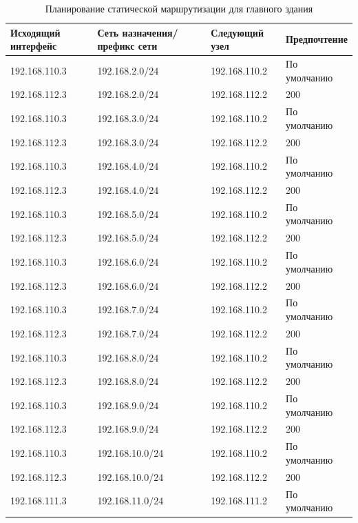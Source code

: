 \documentclass[14pt, a4paper]{extarticle}
\numberwithin{equation}{section}
\begin{document}
\begin{table}[H]
\centering
\small
\caption{Планирование статической маршрутизации для главного здания}
\label{table:staticRoutePlanmainDep}
\begin{tabular}{|m{4cm}|m{3cm}|m{4cm}|m{4cm}|}
\hline
\textbf{Исходящий интерфейс} & \textbf{Сеть назначения/ префикс сети} & \textbf{Следующий узел} & \textbf{Предпочтение}\\ \hline
192.168.110.3 & 192.168.2.0/24 & 192.168.110.2 & По умолчанию \\ \hline
192.168.112.3 & 192.168.2.0/24 & 192.168.112.2 & 200 \\ \hline
192.168.110.3 & 192.168.3.0/24 & 192.168.110.2 & По умолчанию \\ \hline
192.168.112.3 & 192.168.3.0/24 & 192.168.112.2 & 200 \\ \hline
192.168.110.3 & 192.168.4.0/24 & 192.168.110.2 & По умолчанию \\ \hline
192.168.112.3 & 192.168.4.0/24 & 192.168.112.2 & 200 \\ \hline
192.168.110.3 & 192.168.5.0/24 & 192.168.110.2 & По умолчанию \\ \hline
192.168.112.3 & 192.168.5.0/24 & 192.168.112.2 & 200 \\ \hline
192.168.110.3 & 192.168.6.0/24 & 192.168.110.2 & По умолчанию \\ \hline
192.168.112.3 & 192.168.6.0/24 & 192.168.112.2 & 200 \\ \hline
192.168.110.3 & 192.168.7.0/24 & 192.168.110.2 & По умолчанию \\ \hline
192.168.112.3 & 192.168.7.0/24 & 192.168.112.2 & 200 \\ \hline
192.168.110.3 & 192.168.8.0/24 & 192.168.110.2 & По умолчанию \\ \hline
192.168.112.3 & 192.168.8.0/24 & 192.168.112.2 & 200 \\ \hline
192.168.110.3 & 192.168.9.0/24 & 192.168.110.2 & По умолчанию \\ \hline
192.168.112.3 & 192.168.9.0/24 & 192.168.112.2 & 200 \\ \hline
192.168.110.3 & 192.168.10.0/24 & 192.168.110.2 & По умолчанию \\ \hline
192.168.112.3 & 192.168.10.0/24 & 192.168.112.2 & 200 \\ \hline
192.168.111.3 & 192.168.11.0/24 & 192.168.111.2 & По умолчанию \\ \hline
\end{tabular}
\end{table}
\end{document}
